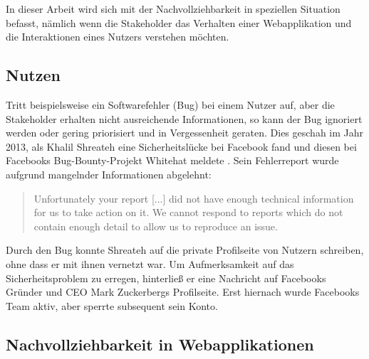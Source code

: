 	In dieser Arbeit wird sich mit der Nachvollziehbarkeit in speziellen Situation befasst, nämlich wenn die Stakeholder das Verhalten einer Webapplikation und die Interaktionen eines Nutzers verstehen möchten.%
	
	\subsection{Nutzen}
	
	Tritt beispielsweise ein Softwarefehler (Bug) bei einem Nutzer auf, aber die Stakeholder erhalten nicht ausreichende Informationen, so kann der Bug ignoriert werden oder gering priorisiert und in Vergessenheit geraten. Dies geschah im Jahr 2013, als Khalil Shreateh eine Sicherheitslücke bei Facebook fand und diesen bei Facebooks Bug-Bounty-Projekt Whitehat meldete \cite{FacebookBugBounyHunt}. Sein Fehlerreport wurde aufgrund mangelnder Informationen abgelehnt:
	
	\begin{quotation}
	Unfortunately your report [...] did not have enough technical information for us to take action  on  it. We  cannot  respond  to  reports  which  do  not contain enough detail to allow us to reproduce an issue.
	\end{quotation}
	
	Durch den Bug konnte Shreateh auf die private Profilseite von Nutzern schreiben, ohne dass er mit ihnen vernetzt war. Um Aufmerksamkeit auf das Sicherheitsproblem zu erregen, hinterließ er eine Nachricht auf Facebooks Gründer und CEO Mark Zuckerbergs Profilseite. Erst hiernach wurde Facebooks Team aktiv, aber sperrte subsequent sein Konto.
	
	\subsection{Nachvollziehbarkeit in Webapplikationen}